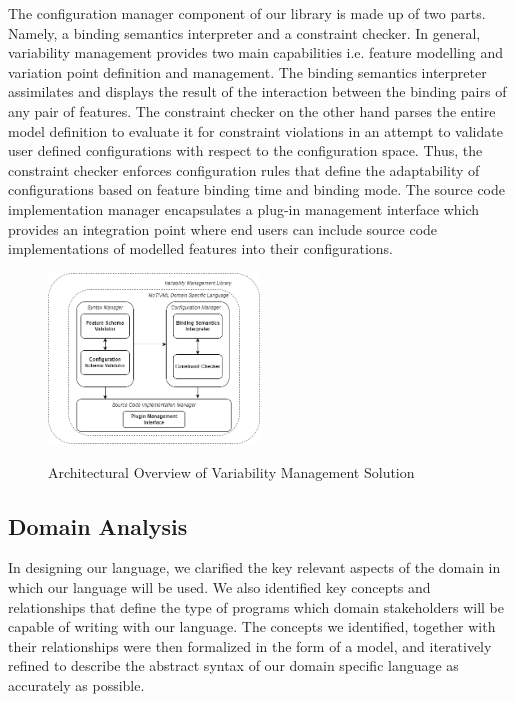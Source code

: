 \documentclass[conference]{IEEEtran}
\begin{document}
The configuration manager component of our library is made up of two parts. Namely, a binding semantics interpreter and a constraint checker. In general, variability management provides two main capabilities i.e. feature modelling and variation point definition and management. The binding semantics interpreter assimilates and displays the result of the interaction between the binding pairs of any pair of features. The constraint checker on the other hand parses the entire model definition to evaluate it for constraint violations in an attempt to validate user defined configurations with respect to the configuration space. Thus, the constraint checker enforces configuration rules that define the adaptability of configurations based on feature binding time and binding mode.
The source code implementation manager encapsulates a plug-in management interface which provides an integration point where end users can include source code implementations of modelled features into their configurations.

\begin{figure}[H]
\caption{Architectural Overview of Variability Management Solution}
\centering
\includegraphics[width=0.5\textwidth]{diagrams/arch-overview.png}
\label{arch-over}
\end{figure}

\subsection{Domain Analysis}
In designing our language, we clarified the key relevant aspects of the domain in which our language will be used. We also identified key concepts and relationships that define the type of programs which domain stakeholders will be capable of writing with our language. The concepts we identified, together with their relationships were then formalized in the form of a model, and iteratively refined to describe the abstract syntax of our domain specific language as accurately as possible. 
\end{document}
